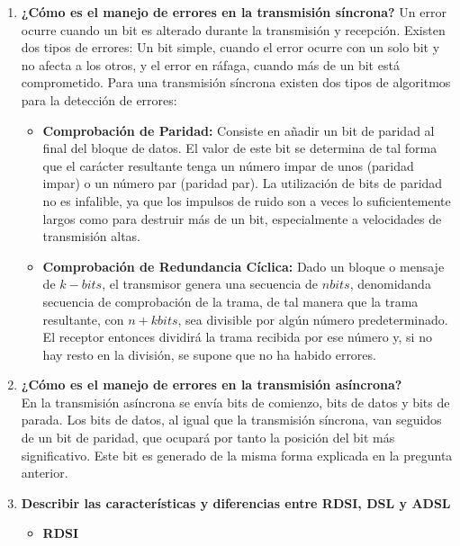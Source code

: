 \documentclass[a4paper,12pt]{article}
\begin{document}
\begin{enumerate}
  \item \textbf{¿Cómo es el manejo de errores en la transmisión síncrona?}  
  Un error ocurre cuando un bit es alterado durante la transmisión y recepción. Existen dos tipos de errores: Un bit simple, cuando
  el error ocurre con un solo bit y no afecta a los otros, y el error en ráfaga, cuando más de un bit está comprometido.
  Para una transmisión síncrona existen dos tipos de algoritmos para la detección de errores:
  \begin{itemize}
   \item \textbf{Comprobación de Paridad:} Consiste en añadir un bit de paridad al final del bloque de datos. El valor de este bit se determina de tal forma que el
   carácter resultante tenga un número impar de unos (paridad impar) o un número par (paridad par). La utilización de bits de paridad no es infalible, ya que
   los impulsos de ruido son a veces lo suficientemente largos como para destruir más de un bit, especialmente a velocidades de transmisión altas.
   \item \textbf{Comprobación de Redundancia Cíclica:} Dado un bloque o mensaje de $k-bits$, el transmisor genera una secuencia de $nbits$, denomidanda
   secuencia de comprobación de la trama, de tal manera que la trama resultante, con $n + k bits$, sea divisible por algún número predeterminado.
   El receptor entonces dividirá la trama recibida por ese número y, si no hay resto en la división, se supone que no ha habido errores.
  \end{itemize}

 
  \item \textbf{¿Cómo es el manejo de errores en la transmisión asíncrona?}\\
  En la transmisión asíncrona se envía bits de comienzo, bits de datos y bits de parada. Los bits de datos, al igual que la transmisión síncrona,
  van seguidos de un bit de paridad, que ocupará por tanto la posición del bit más significativo. Este bit es generado de la misma forma explicada en la pregunta anterior.
  
  \item \textbf{Describir las características y diferencias entre RDSI, DSL y ADSL}
  \begin{itemize}
   \item \textbf{RDSI}
   

\end{itemize}
\end{enumerate}
\end{document}

